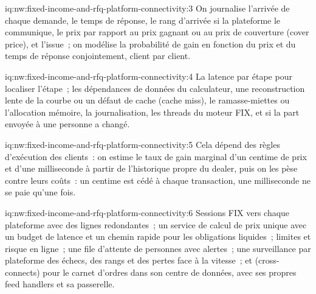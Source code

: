 \begin{solution}{iq:nw:fixed-income-and-rfq-platform-connectivity:3}
On journalise l'arrivée de chaque demande, le temps de réponse, le rang d'arrivée si la plateforme le communique, le prix par rapport au prix gagnant ou au prix
de couverture (cover price), et l'issue~; on modélise la probabilité de gain en fonction du prix et du temps de réponse conjointement, client par client.
\end{solution}

\begin{solution}{iq:nw:fixed-income-and-rfq-platform-connectivity:4}
La latence par étape pour localiser l'étape~; les dépendances de données du calculateur, une reconstruction lente de la courbe ou un défaut de cache (cache miss), le ramasse-miettes ou
l'allocation mémoire, la journalisation, les threads du moteur FIX, et si la part envoyée à une personne a changé.
\end{solution}

\begin{solution}{iq:nw:fixed-income-and-rfq-platform-connectivity:5}
Cela dépend des règles d'exécution des clients~: on estime le taux de gain marginal d'un centime de prix et d'une milliseconde à partir de l'historique propre du dealer, puis on
les pèse contre leurs coûts~: un centime est cédé à chaque transaction, une milliseconde ne se paie qu'une fois.
\end{solution}

\begin{solution}{iq:nw:fixed-income-and-rfq-platform-connectivity:6}
Sessions FIX vers chaque plateforme avec des lignes redondantes~; un service de calcul de prix unique avec un budget de latence et un chemin rapide pour les obligations liquides~; limites
et risque en ligne~; une file d'attente de personnes avec alertes~; une surveillance par plateforme des échecs, des rangs et des pertes face à la vitesse~;  et
 (cross-connects) pour le carnet d'ordres dans son centre de données, avec ses propres feed handlers et sa passerelle.
\end{solution}

